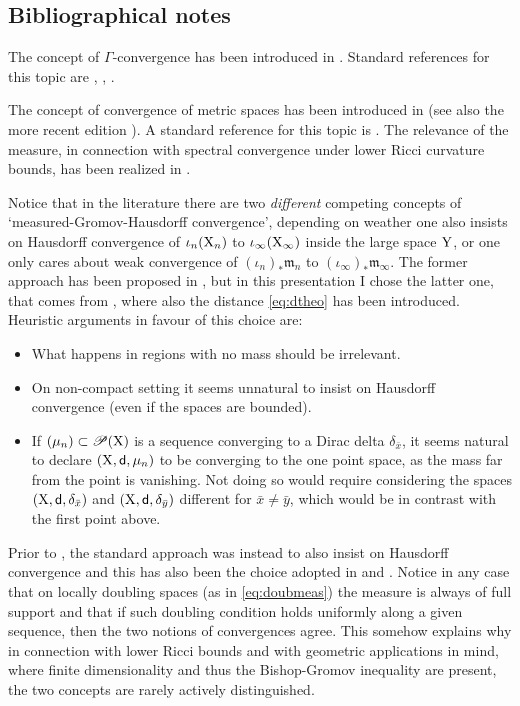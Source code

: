 \documentclass[11pt]{article}
\numberwithin{equation}{section}
\newcommand{\pr}{\mathscr P}
\newcommand{\X}{{\rm X}}
\newcommand{\Y}{{\rm Y}}
\newcommand{\sfd}{{\sf d}}
\newcommand{\mm}{{\mathfrak m}}
\begin{document}
\subsection{Bibliographical notes}
{\footnotesize{The concept of $\Gamma$-convergence has been introduced in \cite{DeGiorgiGamma}. Standard references for this topic are \cite{DalMaso93}, \cite{Braides02}, \cite{Foc12}.

The concept of convergence of metric spaces has been introduced in \cite{Gro81} (see also the more recent edition \cite{Gromov07}).  A standard reference for this topic is \cite{BBI01}. The relevance of the measure, in connection with spectral convergence under lower Ricci curvature bounds, has been realized in \cite{fukaya}. 

Notice that in the literature there are two \emph{different} competing concepts of `measured-Gromov-Hausdorff convergence', depending on weather one also insists on Hausdorff convergence of $\iota_n(\X_n)$ to $\iota_\infty(\X_\infty)$ inside the large space $\Y$, or one only cares about weak convergence of $(\iota_n)_*\mm_n$ to $(\iota_\infty)_*\mm_\infty$. The former approach has been proposed in \cite{fukaya}, but  in this presentation I chose the latter one, that comes from  \cite{Sturm06I}, where also the distance \eqref{eq:dtheo} has been introduced. Heuristic arguments in favour of this choice are:
\begin{itemize}
\item[-] What happens in regions with no mass should be irrelevant.
\item[-]  On non-compact setting  it seems unnatural to insist on Hausdorff  convergence (even if the spaces are  bounded).
\item[-]  If $(\mu_n)\subset\pr(\X)$ is a sequence converging to a Dirac delta $\delta_{\bar x}$, it seems natural to declare $(\X,\sfd,\mu_n)$ to be converging to the one point space, as the mass far from the point is vanishing. Not doing so would require considering the spaces $(\X,\sfd,\delta_{\bar x})$ and $(\X,\sfd,\delta_{\bar y})$ different for $\bar x\neq\bar y$, which  would be in contrast with the first point above.
\end{itemize}
Prior to \cite{Sturm06I}, the standard approach was instead to also insist on Hausdorff convergence and this has also been the choice adopted in \cite{Lott-Villani09} and \cite{Villani09}. Notice in any case that on locally doubling spaces (as in \eqref{eq:doubmeas}) the measure is always of full support and that if such doubling condition holds uniformly along a given sequence, then the two notions of convergences agree. This somehow explains why in connection with lower Ricci bounds and with geometric applications in mind, where finite dimensionality and thus the Bishop-Gromov inequality are present, the two concepts are rarely actively distinguished.




}}
\end{document}
